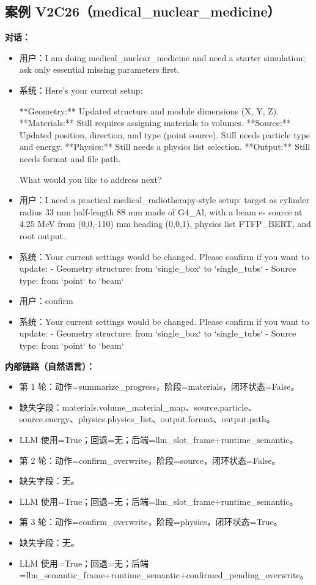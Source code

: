 \documentclass[11pt]{ctexart}
\begin{document}
\subsection{案例 V2C26（medical\_nuclear\_medicine）}
\textbf{对话：}
\begin{itemize}
\item 用户：I am doing medical\_nuclear\_medicine and need a starter simulation; ask only essential missing parameters first.
\item 系统：Here's your current setup:

**Geometry:** Updated structure and module dimensions (X, Y, Z).
**Materials:** Still requires assigning materials to volumes.
**Source:** Updated position, direction, and type (point source). Still needs particle type and energy.
**Physics:** Still needs a physics list selection.
**Output:** Still needs format and file path.

What would you like to address next?
\item 用户：I need a practical medical\_radiotherapy-style setup: target as cylinder radius 33 mm half-length 88 mm made of G4\_Al, with a beam e- source at 4.25 MeV from (0,0,-110) mm heading (0,0,1), physics list FTFP\_BERT, and root output.
\item 系统：Your current settings would be changed. Please confirm if you want to update:
- Geometry structure: from `single\_box` to `single\_tubs`
- Source type: from `point` to `beam`
\item 用户：confirm
\item 系统：Your current settings would be changed. Please confirm if you want to update:
- Geometry structure: from `single\_box` to `single\_tubs`
- Source type: from `point` to `beam`
\end{itemize}
\textbf{内部链路（自然语言）：}
\begin{itemize}
\item 第 1 轮：动作=summarize\_progress，阶段=materials，闭环状态=False。
\item 缺失字段：materials.volume\_material\_map、source.particle、source.energy、physics.physics\_list、output.format、output.path。
\item LLM 使用=True；回退=无；后端=llm\_slot\_frame+runtime\_semantic。
\item 第 2 轮：动作=confirm\_overwrite，阶段=source，闭环状态=False。
\item 缺失字段：无。
\item LLM 使用=True；回退=无；后端=llm\_slot\_frame+runtime\_semantic。
\item 第 3 轮：动作=confirm\_overwrite，阶段=physics，闭环状态=True。
\item 缺失字段：无。
\item LLM 使用=True；回退=无；后端=llm\_semantic\_frame+runtime\_semantic+confirmed\_pending\_overwrite。
\end{itemize}
\end{document}
